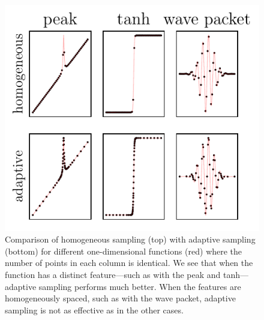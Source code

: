 \begin{figure}
\hypertarget{fig:Learner1D}{%
\centering
\includegraphics{chapter_adaptive/figures/Learner1D.pdf}
\caption{Comparison of homogeneous sampling (top) with adaptive sampling (bottom) for different one-dimensional functions (red) where the number of points in each column is identical.
We see that when the function has a distinct feature---such as with the peak and tanh---adaptive sampling performs much better.
When the features are homogeneously spaced, such as with the wave packet, adaptive sampling is not as effective as in the other cases.}\label{fig:Learner1D}
}
\end{figure}

